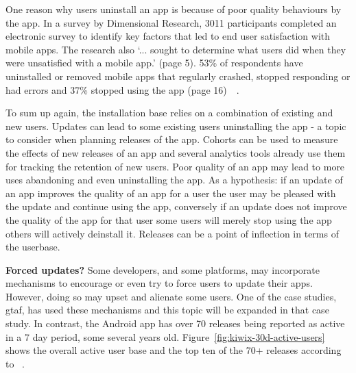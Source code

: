 One reason why users uninstall an app is because of poor quality behaviours by the app. In a survey by Dimensional Research, 3011 participants completed an electronic survey to identify key factors that led to end user satisfaction with mobile apps. The research also `... sought to determine what users did when they were unsatisfied with a mobile app.' (page 5). 
53\% of respondents have uninstalled or removed mobile apps that regularly crashed, stopped responding or had errors and 37\% stopped using the app (page 16)~~.

To sum up again, the installation base relies on a combination of existing and new users. Updates can lead to some existing users uninstalling the app - a topic to consider when planning releases of the app. Cohorts can be used to measure the effects of new releases of an app and several analytics tools already use them for tracking the retention of new users. Poor quality of an app may lead to more uses abandoning and even uninstalling the app. As a hypothesis: if an update of an app improves the quality of an app for a user the user may be pleased with the update and continue using the app, conversely if an update does not improve the quality of the app for that user some users will merely stop using the app others will actively deinstall it. Releases can be a point of inflection in terms of the userbase.

\textbf{Forced updates?} Some developers, and some platforms, may incorporate mechanisms to encourage or even try to force users to update their apps. However, doing so may upset and alienate some users. One of the case studies, \Gls{gtaf}, has used these mechanisms and this topic will be expanded in that case study. In contrast, the  Android app has over 70 releases being reported as active in a 7 day period, some several years old. Figure~\ref{fig:kiwix-30d-active-users} shows the overall active user base and the top ten of the 70+ releases according to ~.

